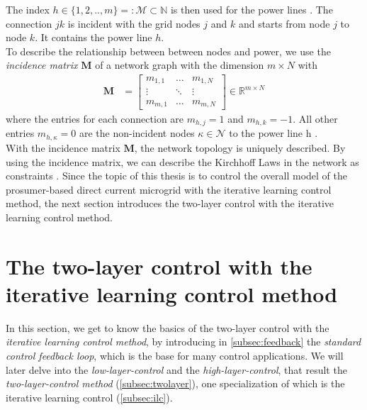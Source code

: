 The index $h \in \{1,2,..,m\} =: \mathcal{M} \subset \mathbb{N}$ is then used for the power lines \cite{lia_master}. The connection $jk$ is incident with the grid nodes $j$ and $k$ and starts from node $j$ to node $k$. It contains the power line $h$. \\To describe the relationship between between nodes and power, we use the \textit{incidence matrix} $\boldsymbol{M}$ of a network graph with the dimension $m \times N$ with 
\begin{align}
\label{equation:incidence_def}
    \boldsymbol{M} &= \begin{bmatrix} m_{1,1} & \dots & m_{1,N} \\ \vdots & \ddots& \vdots \\ m_{m,1} & \dots & m_{m,N} \end{bmatrix} \in \mathbb{R}^{m \times N}
\end{align}
where the entries for each connection are $m_{h,j} = 1$ and $m_{h,k} = -1$. All other entries $m_{h,\kappa}=0$ are the non-incident nodes $\kappa \in \mathcal{N}$ to the power line h \cite{lia_master}. \\ With the incidence matrix $\boldsymbol{M}$, the network topology is uniquely described. By using the incidence matrix, we can describe the Kirchhoff Laws in the network as constraints \cite{lia_master}. Since the topic of this thesis is to control the overall model of the prosumer-based direct current microgrid with the iterative learning control method, the next section introduces the two-layer control with the iterative learning control method.
\section{The two-layer control with the iterative learning control method}
\label{sec:ilc}
In this section, we get to know the basics of the two-layer control with the \textit{iterative learning control method}, by introducing in \ref{subsec:feedback} the \textit{standard control feedback loop}, which is the base for many control applications. We will later delve into the \textit{low-layer-control} and the \textit{high-layer-control}, that result the \textit{two-layer-control method} (\ref{subsec:twolayer}), one specialization of which is the iterative learning control (\ref{subsec:ilc}).
